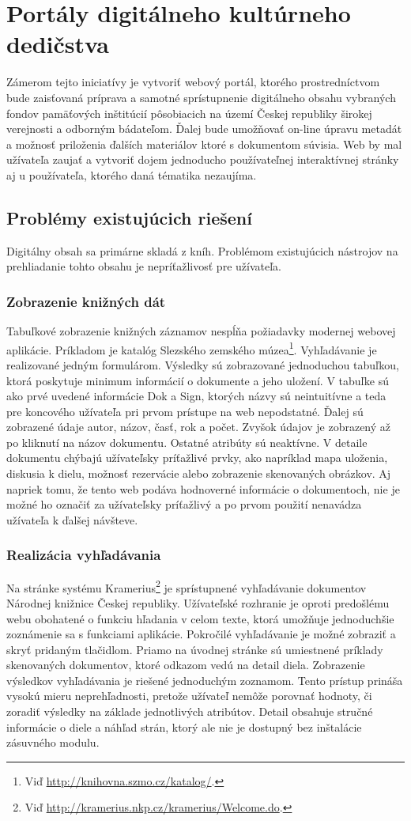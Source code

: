 \documentclass[
  digital, %
  table,   %
  lof,     %
  lot,     %
]{fithesis3}
\begin{document}
\chapter{Portály digitálneho kultúrneho dedičstva}	
Zámerom tejto iniciatívy je vytvoriť webový portál, ktorého prostredníctvom bude zaisťovaná príprava a samotné sprístupnenie digitálneho obsahu vybraných fondov pamäťových inštitúcií pôsobiacich na území Českej republiky širokej verejnosti a odborným bádateľom. Ďalej bude umožňovať on-line úpravu metadát a možnosť priloženia ďalších materiálov ktoré s dokumentom súvisia. Web by mal užívateľa zaujať a vytvoriť dojem jednoducho používateľnej interaktívnej stránky aj u používateľa, ktorého daná tématika nezaujíma.
\section{Problémy existujúcich riešení}
Digitálny obsah sa primárne skladá z kníh. Problémom existujúcich nástrojov na prehliadanie tohto obsahu je nepríťažlivosť pre užívateľa. 
\subsection{Zobrazenie knižných dát}
Tabuľkové zobrazenie knižných záznamov nespĺňa požiadavky modernej webovej aplikácie. Príkladom je katalóg Slezského zemského múzea\footnote{Viď \url{http://knihovna.szmo.cz/katalog/}.}. Vyhľadávanie je realizované jedným formulárom. Výsledky sú zobrazované jednoduchou tabuľkou, ktorá poskytuje minimum informácií o dokumente a jeho uložení. V tabuľke sú ako prvé uvedené informácie Dok a Sign, ktorých názvy sú neintuitívne a teda pre koncového užívateľa pri prvom prístupe na web nepodstatné. Ďalej sú zobrazené údaje autor, názov, časť, rok a počet. Zvyšok údajov je zobrazený až po kliknutí na názov dokumentu. Ostatné atribúty sú neaktívne. V detaile dokumentu chýbajú užívateľsky príťažlivé prvky, ako napríklad mapa uloženia, diskusia k dielu, možnosť rezervácie alebo zobrazenie skenovaných obrázkov. Aj napriek tomu, že tento web podáva hodnoverné informácie o dokumentoch, nie je možné ho označiť za užívateľsky príťažlivý a po prvom použití nenavádza užívateľa k ďalšej návšteve.
\subsection{Realizácia vyhľadávania}
Na stránke systému Kramerius\footnote{Viď \url{http://kramerius.nkp.cz/kramerius/Welcome.do}.} je sprístupnené vyhľadávanie dokumentov Národnej knižnice Českej republiky. Užívateľské rozhranie je oproti predošlému webu obohatené o funkciu hľadania v celom texte, ktorá umožňuje jednoduchšie zoznámenie sa s funkciami aplikácie. Pokročilé vyhľadávanie je možné zobraziť a skryť pridaným tlačidlom. Priamo na úvodnej stránke sú umiestnené príklady skenovaných dokumentov, ktoré odkazom vedú na detail diela. Zobrazenie výsledkov vyhľadávania je riešené jednoduchým zoznamom. Tento prístup prináša vysokú mieru neprehľadnosti, pretože užívateľ nemôže porovnať hodnoty, či zoradiť výsledky na základe jednotlivých atribútov. Detail obsahuje
stručné informácie o diele a náhľad strán, ktorý ale nie je dostupný bez inštalácie zásuvného modulu. 
\end{document}
